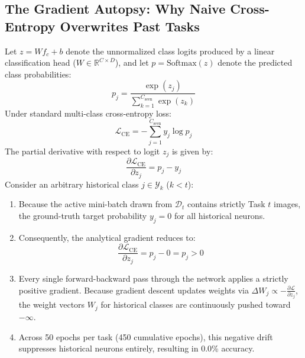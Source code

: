 \documentclass[11pt,a4paper]{article}
\begin{document}
\subsection{The Gradient Autopsy: Why Naive Cross-Entropy Overwrites Past Tasks}
Let $z = W f_c + b$ denote the unnormalized class logits produced by a linear classification head ($W \in \mathbb{R}^{C \times D}$), and let $p = \text{Softmax}(z)$ denote the predicted class probabilities:
\begin{equation}
p_j = \frac{\exp(z_j)}{\sum_{k=1}^{C_{\text{seen}}} \exp(z_k)}
\end{equation}
Under standard multi-class cross-entropy loss:
\begin{equation}
\mathcal{L}_{\text{CE}} = - \sum_{j=1}^{C_{\text{seen}}} y_j \log p_j
\end{equation}
The partial derivative with respect to logit $z_j$ is given by:
\begin{equation}
\frac{\partial \mathcal{L}_{\text{CE}}}{\partial z_j} = p_j - y_j
\end{equation}
Consider an arbitrary historical class $j \in \mathcal{Y}_k$ ($k < t$):
\begin{enumerate}
    \item Because the active mini-batch drawn from $\mathcal{D}_t$ contains strictly Task $t$ images, the ground-truth target probability $y_j = 0$ for all historical neurons.
    \item Consequently, the analytical gradient reduces to:
    \begin{equation}
    \frac{\partial \mathcal{L}_{\text{CE}}}{\partial z_j} = p_j - 0 = p_j > 0
    \end{equation}
    \item Every single forward-backward pass through the network applies a strictly positive gradient. Because gradient descent updates weights via $\Delta W_j \propto - \frac{\partial \mathcal{L}}{\partial z_j}$, the weight vectors $W_j$ for historical classes are continuously pushed toward $-\infty$.
    \item Across 50 epochs per task (450 cumulative epochs), this negative drift suppresses historical neurons entirely, resulting in 0.0\% accuracy.
\end{enumerate}
\end{document}
